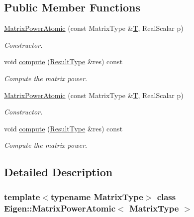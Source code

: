 \subsection*{Public Member Functions}
\begin{DoxyCompactItemize}
\item 
\hyperlink{class_eigen_1_1_matrix_power_atomic_ac0ec5f8d6c203cd9b53e2c95e01037d4}{Matrix\+Power\+Atomic} (const Matrix\+Type \&\hyperlink{group___sparse_core___module}{T}, Real\+Scalar p)
\begin{DoxyCompactList}\small\item\em Constructor. \end{DoxyCompactList}\item 
void \hyperlink{class_eigen_1_1_matrix_power_atomic_ac3cdfb54a5b60079d068784534cbc174}{compute} (\hyperlink{group___core___module_class_eigen_1_1_block}{Result\+Type} \&res) const
\begin{DoxyCompactList}\small\item\em Compute the matrix power. \end{DoxyCompactList}\item 
\hyperlink{class_eigen_1_1_matrix_power_atomic_ac0ec5f8d6c203cd9b53e2c95e01037d4}{Matrix\+Power\+Atomic} (const Matrix\+Type \&\hyperlink{group___sparse_core___module}{T}, Real\+Scalar p)
\begin{DoxyCompactList}\small\item\em Constructor. \end{DoxyCompactList}\item 
void \hyperlink{class_eigen_1_1_matrix_power_atomic_ac3cdfb54a5b60079d068784534cbc174}{compute} (\hyperlink{group___core___module_class_eigen_1_1_block}{Result\+Type} \&res) const
\begin{DoxyCompactList}\small\item\em Compute the matrix power. \end{DoxyCompactList}\end{DoxyCompactItemize}


\subsection{Detailed Description}
\subsubsection*{template$<$typename Matrix\+Type$>$\newline
class Eigen\+::\+Matrix\+Power\+Atomic$<$ Matrix\+Type $>$}


